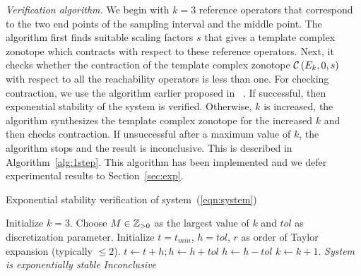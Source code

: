 %
\emph{Verification algorithm.} We begin with $k=3$ reference operators
that correspond to the two end points of the sampling interval and the
middle point.  The algorithm first finds suitable scaling factors $s$
that gives a template complex zonotope which contracts with respect to
these reference operators.  Next, it checks whether the contraction of
the template complex zonotope $\mathcal{C}\left(E_k,0,s\right)$ with respect to all the
reachability operators is less than one. For checking contraction, we
use the algorithm earlier proposed in ~\cite{arvind2016lis}.  If
successful, then exponential stability of the system is verified.
Otherwise, $k$ is increased, the algorithm synthesizes the template
complex zonotope for the increased $k$ and then checks contraction. If
unsuccessful after a maximum value of $k$, the algorithm stops and the
result is inconclusive.  This is described in
Algorithm~\ref{alg:1step}. This algorithm has been implemented and
we defer experimental results to Section~\ref{sec:exp}.
%
 \begin{algorithm}
\caption{Exponential stability verification of system~(\ref{eqn:system})}
\label{alg:1step}
\begin{algorithmic}[1]
\State Initialize $k=3$.
\State Choose $M\in\mathbb{Z}_{> 0}$ as the largest value of $k$ and $tol$ as
discretization parameter.
\State Initialize $t=t_{min}$, $h=tol$, $r$ as order of Taylor
expansion (typically $\leq 2$).
\State $t\gets t+h; h\gets h+tol$
\Else
\State $h\gets h-tol$
\EndIf
\EndWhile
{}
\Else
\State $k\gets k+1$.  
\EndIf
\EndWhile
{}
\State \emph{System is exponentially stable}
\Else
\State \emph{Inconclusive}
\EndIf
\end{algorithmic}
\end{algorithm}



